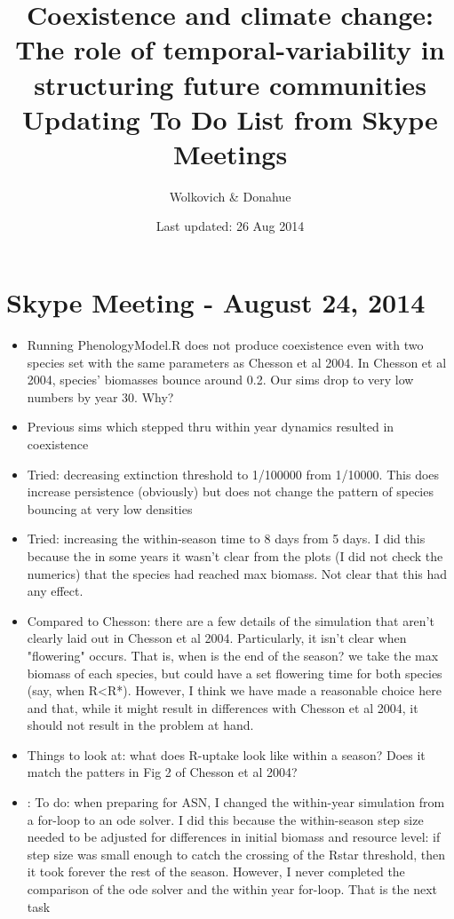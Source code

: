 \documentclass[11pt,a4paper,oneside]{article}
\begin{document}
\renewcommand{\labelitemi}{$-$}
\title{Coexistence and climate change: \\The role of
    temporal-variability in structuring future communities \\Updating To Do List from Skype Meetings}
    \author{Wolkovich \& Donahue}
\date{Last updated: 26 Aug 2014}
\maketitle

\newpage
\tableofcontents

\section{Skype Meeting - August 24, 2014}
\begin{itemize}
\item Running PhenologyModel.R does not produce coexistence even with two species set with the same parameters as Chesson et al 2004.  In Chesson et al 2004, species' biomasses bounce around 0.2.  Our sims drop to very low numbers by year 30.  Why?
\item Previous sims which stepped thru within year dynamics resulted in coexistence
\item Tried: decreasing extinction threshold to 1/100000 from 1/10000.  This does increase persistence (obviously) but does not change the pattern of species bouncing at very low densities
\item Tried: increasing the within-season time to 8 days from 5 days.  I did this because the in some years it wasn't clear from the plots (I did not check the numerics) that the species had reached max biomass.  Not clear that this had any effect.
\item Compared to Chesson: there are a few details of the simulation that aren't clearly laid out in Chesson et al 2004.  Particularly, it isn't clear when "flowering" occurs.  That is,  when is the end of the season?  we take the max biomass of each species, but could have a set flowering time for both species (say, when R<R*).  However, I think we have made a reasonable choice here and that, while it might result in differences with Chesson et al 2004, it should not result in the problem at hand.
\item Things to look at: what does R-uptake look like within a season?  Does it match the patters in Fig 2 of Chesson et al 2004?
\item: To do: when preparing for ASN, I changed the within-year simulation from a for-loop to an ode solver.  I did this because the within-season step size needed to be adjusted for differences in initial biomass and resource level: if step size was small enough to catch the crossing of the Rstar threshold, then it took forever the rest of the season.  However, I never completed the comparison of the ode solver and the within year for-loop.  That is the next task
\end{itemize}
\end{document}
